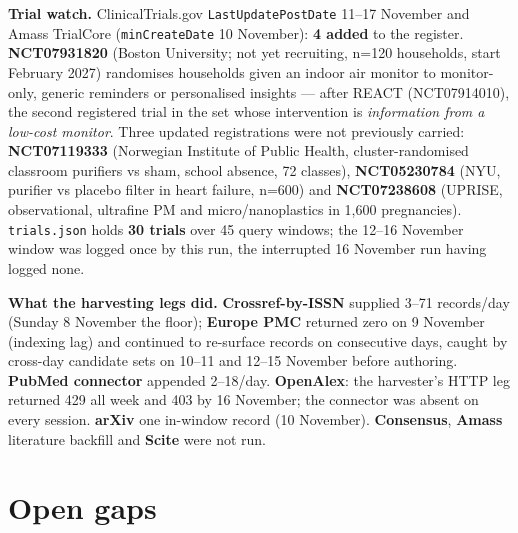 \documentclass[10pt]{article}
\begin{document}
\vspace{1.5mm}
\textbf{Trial watch.} ClinicalTrials.gov \texttt{LastUpdatePostDate} 11--17 November and Amass TrialCore
(\texttt{minCreateDate} 10 November): \textbf{4 added} to the register. \textbf{NCT07931820} (Boston University;
not yet recruiting, n=120 households, start February 2027) randomises households given an indoor air monitor to
monitor-only, generic reminders or personalised insights --- after REACT (NCT07914010), the second registered trial
in the set whose intervention is \emph{information from a low-cost monitor}. Three updated registrations were not
previously carried: \textbf{NCT07119333} (Norwegian Institute of Public Health, cluster-randomised classroom
purifiers vs sham, school absence, 72 classes), \textbf{NCT05230784} (NYU, purifier vs placebo filter in heart
failure, n=600) and \textbf{NCT07238608} (UPRISE, observational, ultrafine PM and micro/nanoplastics in 1,600
pregnancies). \texttt{trials.json} holds \textbf{30 trials} over 45 query windows; the 12--16 November window was
logged once by this run, the interrupted 16 November run having logged none.

\vspace{1.5mm}
\textbf{What the harvesting legs did.} \textbf{Crossref-by-ISSN} supplied 3--71 records/day (Sunday 8 November
the floor); \textbf{Europe PMC} returned zero on 9 November (indexing lag) and continued to re-surface records on
consecutive days, caught by cross-day candidate sets on 10--11 and 12--15 November before authoring.
\textbf{PubMed connector} appended 2--18/day. \textbf{OpenAlex}: the harvester's HTTP leg returned 429 all week and
403 by 16 November; the connector was absent on every session. \textbf{arXiv} one in-window record (10 November).
\textbf{Consensus}, \textbf{Amass} literature backfill and \textbf{Scite} were not run.

\vspace{2mm}
\section*{\sffamily\bfseries\color{Deep}Open gaps}
\vspace{-1.5mm}{\color{Teal}\rule{\linewidth}{1.1pt}}\vspace{2.5mm}
\end{document}
